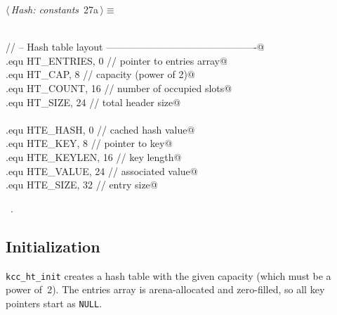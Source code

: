 \documentclass[11pt,a4paper,twoside,openright,DIV=15]{scrbook}
\theoremstyle{definition}
\theoremstyle{plain}
\theoremstyle{remark}
\begin{document}
\begin{flushleft} \small
\begin{minipage}{\linewidth}\label{scrap19}\raggedright\small
{} $\langle\,${\itshape Hash: constants}\nobreak\ {\footnotesize {27a}}$\,\rangle\equiv$
\vspace{-1ex}
\begin{list}{}{} \item
\mbox{}\verb@@\\
\mbox{}\verb@// -- Hash table layout ----------------------------------------------@\\
\mbox{}\verb@.equ HT_ENTRIES,       0     // pointer to entries array@\\
\mbox{}\verb@.equ HT_CAP,           8     // capacity (power of 2)@\\
\mbox{}\verb@.equ HT_COUNT,        16     // number of occupied slots@\\
\mbox{}\verb@.equ HT_SIZE,         24     // total header size@\\
\mbox{}\verb@@\\
\mbox{}\verb@.equ HTE_HASH,         0     // cached hash value@\\
\mbox{}\verb@.equ HTE_KEY,          8     // pointer to key@\\
\mbox{}\verb@.equ HTE_KEYLEN,      16     // key length@\\
\mbox{}\verb@.equ HTE_VALUE,       24     // associated value@\\
\mbox{}\verb@.equ HTE_SIZE,        32     // entry size@\\
\mbox{}\verb@@{\NWsep}
\end{list}
\vspace{-1.5ex}
\footnotesize
\begin{list}{}{\setlength{\itemsep}{-\parsep}\setlength{\itemindent}{-\leftmargin}}
\item \NWtxtMacroRefIn\ .

\item{}
\end{list}
\end{minipage}\vspace{4ex}
\end{flushleft}
\subsection{Initialization}

\texttt{kcc\_ht\_init} creates a hash table with the given capacity
(which must be a power of~2).  The entries array is arena-allocated
and zero-filled, so all key pointers start as \texttt{NULL}.
\end{document}
